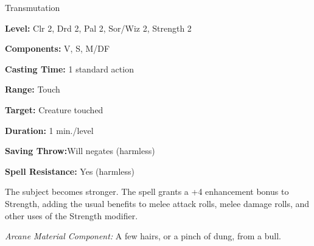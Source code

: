 
Transmutation

\textbf{Level:} Clr 2, Drd 2, Pal 2, Sor/Wiz 2, Strength 2

\textbf{Components:} V, S, M/DF

\textbf{Casting Time:} 1 standard action

\textbf{Range:} Touch

\textbf{Target:} Creature touched

\textbf{Duration:} 1 min./level

\textbf{Saving Throw:}Will negates (harmless)

\textbf{Spell Resistance:} Yes (harmless)

The subject becomes stronger. The spell grants a +4 enhancement bonus to Strength, 
adding the usual benefits to melee attack rolls, melee damage rolls, and other 
uses of the Strength modifier.

\textit{Arcane Material Component:} A few hairs, or a pinch of dung, from a bull.


